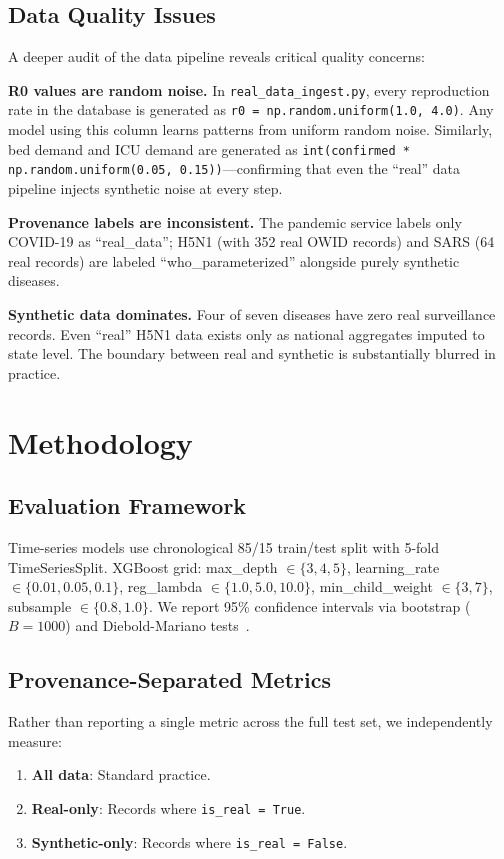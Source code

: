 \documentclass{ieeeaccess}
\begin{document}
\subsection{Data Quality Issues}
A deeper audit of the data pipeline reveals critical quality concerns:

\textbf{R0 values are random noise.} In \texttt{real\_data\_ingest.py}, every reproduction rate in the database is generated as \texttt{r0 = np.random.uniform(1.0, 4.0)}. Any model using this column learns patterns from uniform random noise. Similarly, bed demand and ICU demand are generated as \texttt{int(confirmed * np.random.uniform(0.05, 0.15))}---confirming that even the ``real'' data pipeline injects synthetic noise at every step.

\textbf{Provenance labels are inconsistent.} The pandemic service labels only COVID-19 as ``real\_data''; H5N1 (with 352 real OWID records) and SARS (64 real records) are labeled ``who\_parameterized'' alongside purely synthetic diseases.

\textbf{Synthetic data dominates.} Four of seven diseases have zero real surveillance records. Even ``real'' H5N1 data exists only as national aggregates imputed to state level. The boundary between real and synthetic is substantially blurred in practice.

\section{Methodology}
\label{sec:methodology}

\subsection{Evaluation Framework}
Time-series models use chronological 85/15 train/test split with 5-fold TimeSeriesSplit. XGBoost grid: max\_depth $\in \{3,4,5\}$, learning\_rate $\in \{0.01, 0.05, 0.1\}$, reg\_lambda $\in \{1.0, 5.0, 10.0\}$, min\_child\_weight $\in \{3,7\}$, subsample $\in \{0.8, 1.0\}$. We report 95\% confidence intervals via bootstrap ($B=1000$) and Diebold-Mariano tests~\cite{diebold1995}.

\subsection{Provenance-Separated Metrics}
Rather than reporting a single metric across the full test set, we independently measure:
\begin{enumerate}
    \item \textbf{All data}: Standard practice.
    \item \textbf{Real-only}: Records where \texttt{is\_real = True}.
    \item \textbf{Synthetic-only}: Records where \texttt{is\_real = False}.
\end{enumerate}
\end{document}
